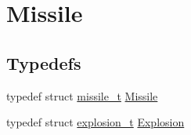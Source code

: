 \hypertarget{group___missile}{}\section{Missile}
\label{group___missile}
\subsection*{Typedefs}
\begin{DoxyCompactItemize}
\item 
typedef struct \hyperlink{structmissile__t}{missile\+\_\+t} \hyperlink{group___missile_ga7ea98f7c879356e5dfa41934529d86e1}{Missile}
\item 
typedef struct \hyperlink{structexplosion__t}{explosion\+\_\+t} \hyperlink{group___missile_gab15157e0eccd9297f66644015d4966b1}{Explosion}
\end{DoxyCompactItemize}
